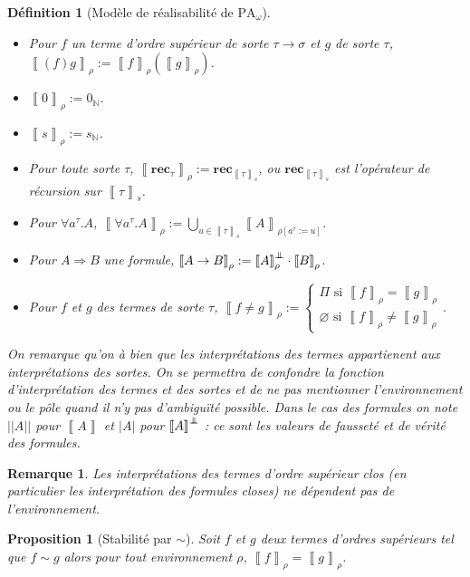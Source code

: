 \documentclass[a4paper,12pt]{article}
\newtheorem{prop}[theo]{Proposition}
\newtheorem{defi}[theo]{Définition}
\theoremstyle{rmqstyle}
\newtheorem{rmq}[theo]{Remarque}
\newcommand{\N}{\mathbb{N}}
\newcommand{\abs}[1]{\lvert#1\rvert}
\newcommand{\abss}[1]{\lvert \lvert#1\rvert \rvert}
\newcommand{\itp}[1]{\left\llbracket#1\right\rrbracket}
\newcommand{\PA}{\mathrm{PA}}
\newcommand{\rec}{\mathbf{rec}}
\renewcommand{\implies}{\Rightarrow}
\newcommand{\pole}{{\protect\mathpalette{\protect\polehelper}{\bot}}} \def\polehelper#1#2{\mathrel{\rlap{$#1#2$}\mkern3mu{#1#2}}}
\begin{document}
\begin{defi}[Modèle de réalisabilité de $\PA_\omega$]
\begin{itemize}
\item Pour $f$ un terme d'ordre supérieur de sorte $\tau \to \sigma$ et $g$ de sorte $\tau$, $\itp{(f)g}_\rho := \itp{f}_\rho(\itp{g}_\rho)$.\\
\item $\itp{0}_\rho := 0_\N$.\\
\item $\itp{s}_\rho := s_\N$.\\
\item Pour toute sorte $\tau$, $\itp{\rec_\tau}_\rho := \rec_{\itp{\tau}_s}$, ou $\rec_{\itp{\tau}_s}$ est l'opérateur de récursion sur $\itp{\tau}_s$.\\
\item Pour $\forall a^\tau. A$, $\itp{\forall a^\tau. A}_\rho := \bigcup_{u \in \itp{\tau}_s} \itp{A}_{\rho[a^\tau := u]}$.\\
\item Pour $A \implies B$ une formule, $\itp{A \to B}_\rho := \itp{A}_\rho^\pole \cdot \itp{B}_\rho$.\\
\item Pour $f$ et $g$ des termes de sorte $\tau$, $\itp{f \neq g}_\rho := 
\left\{ \begin{array}{c}
\Pi \text{ si } \itp{f}_\rho = \itp{g}_\rho \\
\varnothing \text{ si } \itp{f}_\rho \neq \itp{g}_\rho
\end{array}\right.$.
\end{itemize}
On remarque qu'on à bien que les interprétations des termes appartienent aux interprétations des sortes. On se permettra de confondre la fonction d'interprétation des termes et des sortes et de ne pas mentionner l'environnement ou le pôle quand il n'y pas d'ambiguïté possible. Dans le cas des formules on note $\abss{A}$ pour $\itp{A}$ et $\abs{A}$ pour $\itp{A}^\pole$ : ce sont les valeurs de fausseté et de vérité des formules.  
\end{defi}

\begin{rmq}
Les interprétations des termes d'ordre supérieur clos (en particulier les interprétation des formules closes) ne dépendent pas de l'environnement. 
\end{rmq}

\begin{prop}[Stabilité par $\sim$]
\label{sim stab}
Soit $f$ et $g$ deux termes d'ordres supérieurs tel que $f \sim g$ alors pour tout environnement $\rho$, $\itp{f}_\rho = \itp{g}_\rho$.
\end{prop}
\end{document}
